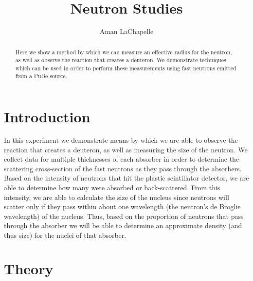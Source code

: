 \documentclass{article}
\title{Neutron Studies}
\author{Aman LaChapelle}
\begin{document}
\raggedright
\maketitle

\begin{abstract}
  Here we show a method by which we can measure an effective radius for the neutron, as well as observe the reaction that creates a deuteron.  We demonstrate techniques which can be used in order to perform these measurements using fast neutrons emitted from a PuBe source.
\end{abstract}

\tableofcontents
\newpage

\section{Introduction}
  In this experiment we demonstrate means by which we are able to observe the reaction that creates a deuteron, as well as measuring the size of the neutron.  We collect data for multiple thicknesses of each absorber in order to determine the scattering cross-section of the fast neutrons as they pass through the absorbers.  Based on the intensity of neutrons that hit the plastic scintillator detector, we are able to determine how many were absorbed or back-scattered.  From this intensity, we are able to calculate the size of the nucleus since neutrons will scatter only if they pass within about one wavelength (the neutron's de Broglie wavelength) of the nucleus.  Thus, based on the proportion of neutrons that pass through the absorber we will be able to determine an approximate density (and thus size) for the nuclei of that absorber.

\section{Theory}
\end{document}
